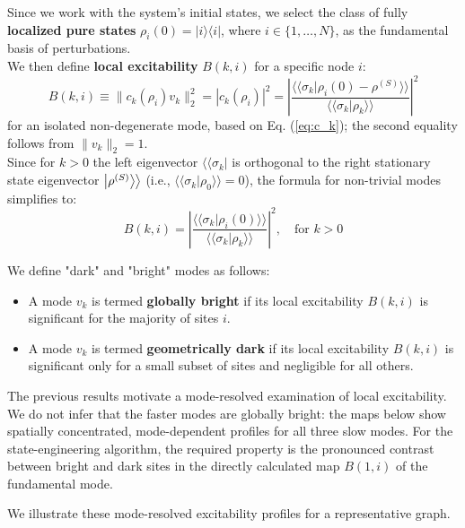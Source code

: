 \documentclass[pdflatex,sn-mathphys-num]{sn-jnl}
\newcommand{\ketket}[1]{\left| #1 \right\rangle \! \mathclose{\left. \vphantom{#1} \right\rangle}}
\begin{document}
Since we work with the system's initial states, we select the class of fully \textbf{localized pure states} $\rho_i(0)=|i\rangle\langle i|$, where $i\in \{1, \dots, N\}$, as the fundamental basis of perturbations.
\\
We then define \textbf{local excitability} $B(k, i)$ for a specific node $i$:
\begin{equation}
    B(k, i) \equiv \lVert c_k(\rho_i)v_k\rVert_2^2 = |c_k(\rho_i)|^2 = \left| \frac{\langle\langle\sigma_k | \rho_i(0) - \rho^{(S)}\rangle\rangle}{\langle\langle\sigma_k | \rho_k\rangle\rangle} \right|^2
    \label{local_excitability}
\end{equation}
for an isolated non-degenerate mode, based on Eq. (\ref{eq:c_k}); the second equality follows from $\lVert v_k\rVert_2=1$.\\
Since for $k > 0$ the left eigenvector $\langle\langle\sigma_k|$ is orthogonal to the right stationary state eigenvector $\ketket{\rho^{(S)}}$ (i.e., $\langle\langle\sigma_k|\rho_0\rangle\rangle=0$), the formula for non-trivial modes simplifies to:
    \begin{equation}
    B(k, i) = \left| \frac{\langle\langle\sigma_k | \rho_i(0)\rangle\rangle}{\langle\langle\sigma_k | \rho_k\rangle\rangle} \right|^2, \quad \text{for } k > 0
    \label{eq:B_k_i}
    \end{equation}

We define "dark" and "bright" modes as follows:
\begin{itemize}
    \item A mode $v_k$ is termed \textbf{globally bright} if its local excitability $B(k, i)$ is significant for the majority of sites $i$.
    \item A mode $v_k$ is termed \textbf{geometrically dark} if its local excitability $B(k, i)$ is significant only for a small subset of sites and negligible for all others.
\end{itemize}

The previous results motivate a mode-resolved examination of local excitability. We do not infer that the faster modes are globally bright: the maps below show spatially concentrated, mode-dependent profiles for all three slow modes. For the state-engineering algorithm, the required property is the pronounced contrast between bright and dark sites in the directly calculated map $B(1,i)$ of the fundamental mode.

We illustrate these mode-resolved excitability profiles for a representative graph.
\end{document}
